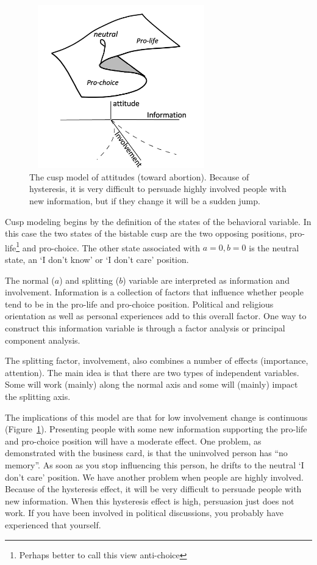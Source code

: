 \documentclass[
  letterpaper,
]{scrbook}
\begin{document}
\begin{figure}

{\centering \includegraphics[width=3.12719in,height=2.78396in]{media/ch3/image13.jpg}

}

\caption{\label{fig-ch3-img13-old-25}The cusp model of attitudes (toward
abortion). Because of hysteresis, it is very difficult to persuade
highly involved people with new information, but if they change it will
be a sudden jump.}

\end{figure}

Cusp modeling begins by the definition of the states of the behavioral
variable. In this case the two states of the bistable cusp are the two
opposing positions, pro-life\footnote{Perhaps better to call this view
  anti-choice} and pro-choice. The other state associated with
\(a = 0, b = 0\) is the neutral state, an `I don't know' or `I don't
care' position.

The normal (\(a\)) and splitting (\(b\)) variable are interpreted as
information and involvement. Information is a collection of factors that
influence whether people tend to be in the pro-life and pro-choice
position. Political and religious orientation as well as personal
experiences add to this overall factor. One way to construct this
information variable is through a factor analysis or principal component
analysis.

The splitting factor, involvement, also combines a number of effects
(importance, attention). The main idea is that there are two types of
independent variables. Some will work (mainly) along the normal axis and
some will (mainly) impact the splitting axis.

The implications of this model are that for low involvement change is
continuous (Figure~\ref{fig-ch3-img13-old-25}). Presenting people with
some new information supporting the pro-life and pro-choice position
will have a moderate effect. One problem, as demonstrated with the
business card, is that the uninvolved person has ``no memory''. As soon
as you stop influencing this person, he drifts to the neutral `I don't
care' position. We have another problem when people are highly involved.
Because of the hysteresis effect, it will be very difficult to persuade
people with new information. When this hysteresis effect is high,
persuasion just does not work. If you have been involved in political
discussions, you probably have experienced that yourself.
\end{document}
